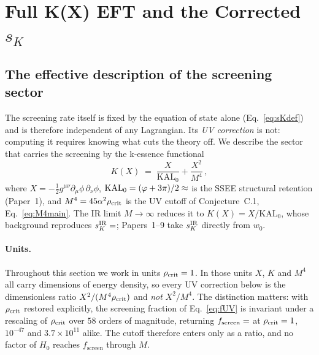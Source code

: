 \documentclass[12pt,a4paper]{article}
\newcommand{\phiG}{\varphi}
\newcommand{\KAL}{\mathrm{KAL}_0}
\newcommand{\fsc}{f_{\mathrm{screen}}}
\newcommand{\sK}{s_K}
\newcommand{\rhoc}{\rho_{\rm crit}}
\begin{document}
\section{Full K(X) EFT and the Corrected $\sK$}
\label{sec:EFT}

\subsection{The effective description of the screening sector}

The screening rate itself is fixed by the equation of state alone
(Eq.~\eqref{eq:sKdef}) and is therefore independent of any Lagrangian. Its
\emph{UV correction} is not: computing it requires knowing what cuts the
theory off. We describe the sector that carries the screening by the
k-essence functional \citep{ArmendarizPicon2001}
\begin{equation}
  K(X) \;=\; \frac{X}{\KAL} + \frac{X^2}{M^4}\,,
  \label{eq:KX}
\end{equation}
where $X = -\tfrac{1}{2}g^{\mu\nu}\partial_\mu\phi\,\partial_\nu\phi$,
$\KAL = (\phiG+3\pi)/2 \approx \val{KAL0_d3}$ is the SSEE structural retention
(Paper~1), and $M^4 = 45\alpha^2\rhoc$ is the UV cutoff of Conjecture~C.1,
Eq.~\eqref{eq:M4main}.
The IR limit $M \to \infty$ reduces it to $K(X) = X/\KAL$, whose background
reproduces $\sK^{\rm IR} = \val{S_K_d6}$; Papers~1--9 take $\sK^{\rm IR}$ directly from
$w_0$.

\paragraph{Units.}
Throughout this section we work in units $\rhoc = 1$. In those units $X$,
$K$ and $M^4$ all carry dimensions of energy density, so every UV correction
below is the dimensionless ratio $X^2/(M^4\rhoc)$ and \emph{not} $X^2/M^4$.
The distinction matters: with $\rhoc$ restored explicitly, the screening
fraction of Eq.~\eqref{eq:fUV} is invariant under a rescaling of $\rhoc$ over
$58$ orders of magnitude, returning $\fsc = \val{F_SCREEN_d12}$ at
$\rhoc = 1$, $10^{-47}$ and $3.7\times10^{11}$ alike. The cutoff therefore
enters only as a ratio, and no factor of $H_0$ reaches $\fsc$ through $M$.
\end{document}
